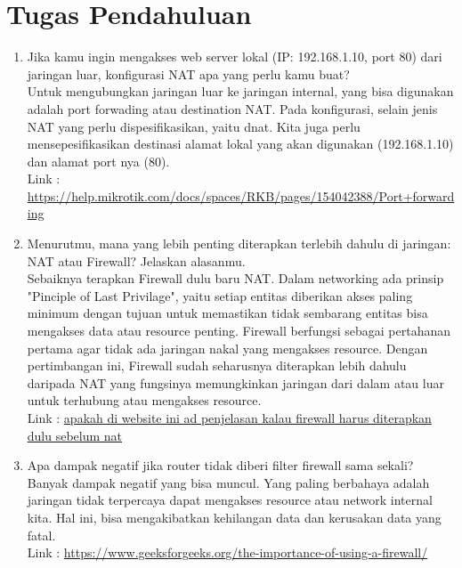 \section{Tugas Pendahuluan}
\begin{enumerate}
	\item Jika kamu ingin mengakses web server lokal (IP: 192.168.1.10, port 80) dari jaringan luar, konfigurasi NAT apa yang perlu kamu buat?\\
	Untuk mengubungkan jaringan luar ke jaringan internal, yang bisa digunakan adalah port forwading atau destination NAT. Pada konfigurasi, selain jenis NAT yang perlu dispesifikasikan, yaitu dnat. Kita juga perlu mensepesifikasikan destinasi alamat lokal yang akan digunakan (192.168.1.10) dan alamat port nya (80). \\
	Link : \url{https://help.mikrotik.com/docs/spaces/RKB/pages/154042388/Port+forwarding}
	\item Menurutmu, mana yang lebih penting diterapkan terlebih dahulu di jaringan: NAT atau Firewall? Jelaskan alasanmu.\\
	Sebaiknya terapkan Firewall dulu baru NAT. Dalam networking ada prinsip "Pinciple of Last Privilage", yaitu setiap entitas diberikan akses paling minimum dengan tujuan untuk memastikan tidak sembarang entitas bisa mengakses data atau resource penting. Firewall berfungsi sebagai pertahanan pertama agar tidak ada jaringan nakal yang mengakses resource. Dengan pertimbangan ini, Firewall sudah seharusnya diterapkan lebih dahulu daripada NAT yang fungsinya memungkinkan jaringan dari dalam atau luar untuk terhubung atau mengakses resource. \\
	Link : \url{apakah di website ini ad penjelasan kalau firewall harus diterapkan dulu sebelum nat}
	\item Apa dampak negatif jika router tidak diberi filter firewall sama sekali?\\
	Banyak dampak negatif yang bisa muncul. Yang paling berbahaya adalah jaringan tidak terpercaya dapat mengakses resource atau network internal kita. Hal ini, bisa mengakibatkan kehilangan data dan kerusakan data yang fatal.\\
	Link : \url{https://www.geeksforgeeks.org/the-importance-of-using-a-firewall/}
\end{enumerate}